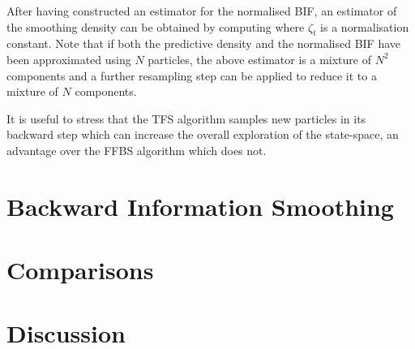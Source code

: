 After having constructed an estimator for the normalised BIF, an estimator of the smoothing density can be obtained by computing
%
%
where $\zeta_{t}$ is a normalisation constant. Note that if both the predictive density and the normalised BIF have been approximated using $N$ particles, the above estimator is a mixture of $N^{2}$ components and a further resampling step can be applied to reduce it to a mixture of $N$ components. 

It is useful to stress that the TFS algorithm samples new particles in its backward step which can increase the overall exploration of the state-space, an advantage over the FFBS algorithm which does not. 



\section{Backward Information Smoothing}

\section{Comparisons}

\section{Discussion}